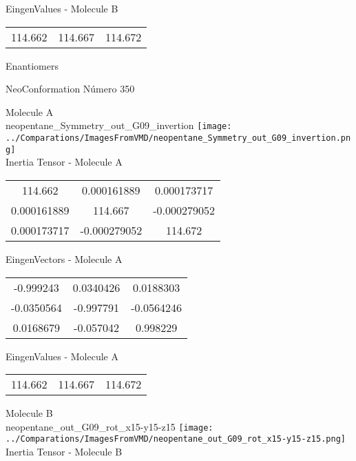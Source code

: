 \begin{multicols}{2}
\begin{center}
\vtab
 EingenValues - Molecule B     \\
\vtab
\begin{tabular}{|c c c|}
114.662	 & 	114.667	 & 	114.672	 \\
\end{tabular}

\end{center}
\end{multicols}
\begin{center}
\vtab
\vtab
\textcolor{NavyBlue}{\Large Enantiomers}
\end{center}

 \newpage

\vtab[-2cm]
\begin{center}
{\large NeoConformation \tab Número 350}
\end{center}
\begin{multicols}{2}
\begin{center}

Molecule A \\ 
neopentane\_Symmetry\_out\_G09\_invertion
\texttt{[image: ../Comparations/ImagesFromVMD/neopentane\_Symmetry\_out\_G09\_invertion.png]}
\\
Inertia Tensor - Molecule A \\
\vtab

\begin{tabular}{|c c c|}
114.662	 & 	0.000161889	 & 	0.000173717	 \\
0.000161889	 & 	114.667	 & 	-0.000279052	 \\
0.000173717	 & 	-0.000279052	 & 	114.672
\end{tabular}

\vtab
 EingenVectors - Molecule A     \\
\vtab
\begin{tabular}{|c c c|}
-0.999243	 & 	0.0340426	 & 	0.0188303	 \\
-0.0350564	 & 	-0.997791	 & 	-0.0564246	 \\
0.0168679	 & 	-0.057042	 & 	0.998229
\end{tabular}

\vtab
 EingenValues - Molecule A     \\
\vtab
\begin{tabular}{|c c c|}
114.662	 & 	114.667	 & 	114.672	 \\
\end{tabular}
\columnbreak

Molecule B \\ 
neopentane\_out\_G09\_rot\_x15-y15-z15
\texttt{[image: ../Comparations/ImagesFromVMD/neopentane\_out\_G09\_rot\_x15-y15-z15.png]}
\\
Inertia Tensor - Molecule B \\
\vtab


\end{center}
\end{multicols}
